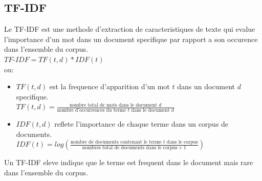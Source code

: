 \documentclass[12pt,a4paper]{report}
\begin{document}
	\subsection{TF-IDF}
	Le TF-IDF est une methode d'extraction de caracteristiques de texte qui evalue l'importance d'un mot dans un document specifique par rapport a son occurence dans l'ensemble du corpus.\\
	$TF\text{-}IDF = TF(t,d) * IDF(t)$\\[2 cm]
	ou:
	\begin{itemize}
	\item $TF(t, d)$ est la frequence d'apparition d'un mot $t$ dans un document $d$ specifique.\\
	$TF(t, d)=\frac{\text{nombre total de mots dans le document } d}{\text{nombre d'occurrences du terme } t \text{ dans le document } d}$
	\item $IDF(t, d)$ reflete l'importance de chaque terme dans un corpus de documents.\\
	$IDF(t)=log(\frac{\text{nombre de documents contenant le terme } t \text{ dans le corpus}}{\text{nombres total de documents dans le corpus}+1})$
	\end{itemize}
	Un TF-IDF eleve indique que le terme est frequent dans le document mais rare dans l'ensemble du corpus.
\end{document}
